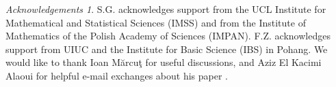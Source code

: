 \documentclass[11pt, letterpaper, oneside,reqno]{amsart}
\theoremstyle{plain}
\theoremstyle{underline}
\theoremstyle{definition}
\theoremstyle{remark}
\newtheorem*{ack}{Acknowledgements}
\begin{document}
	
	
	
	
	
	
	\color{black}	
	\begin{ack}
		S.G. acknowledges support from the UCL Institute for Mathematical and Statistical Sciences (IMSS) and from the Institute of Mathematics of the Polish Academy of Sciences (IMPAN). F.Z. acknowledges support from UIUC and the Institute for Basic Science (IBS) in Pohang.  We would like to thank Ioan M\u{a}rcu\c{t} for useful discussions, and Aziz El Kacimi Alaoui for helpful e-mail exchanges about his paper \cite{Kacimi}.
	\end{ack}
	
\end{document}
